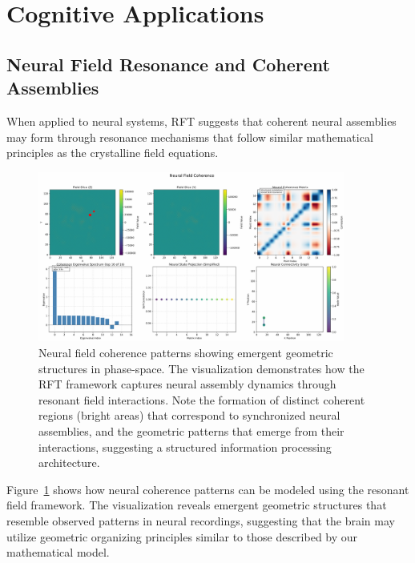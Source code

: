 \documentclass[12pt,letterpaper]{article}
\begin{document}
\section{Cognitive Applications}
\label{sec:cognitive_applications}

\vspace{2mm}
\subsection{Neural Field Resonance and Coherent Assemblies}
\label{subsec:neural_field}

When applied to neural systems, RFT suggests that coherent neural assemblies may form through resonance mechanisms that follow similar mathematical principles as the crystalline field equations.

\begin{figure}[H]
    \centering
    \includegraphics[width=0.9\textwidth]{figures/neural_coherence.pdf}
    \caption{Neural field coherence patterns showing emergent geometric structures in phase-space. The visualization demonstrates how the RFT framework captures neural assembly dynamics through resonant field interactions. Note the formation of distinct coherent regions (bright areas) that correspond to synchronized neural assemblies, and the geometric patterns that emerge from their interactions, suggesting a structured information processing architecture.}
    \label{fig:neural}
\end{figure}

Figure~\ref{fig:neural} shows how neural coherence patterns can be modeled using the resonant field framework. The visualization reveals emergent geometric structures that resemble observed patterns in neural recordings, suggesting that the brain may utilize geometric organizing principles similar to those described by our mathematical model.
\end{document}
